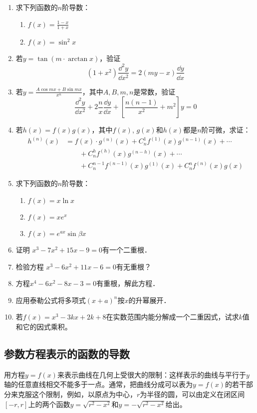 \begin{ex}
\begin{enumerate}
    \item 求下列函数的$n$阶导数：
\begin{multicols}{2}
\begin{enumerate}
    \item $f(x)=\frac{1-x}{1+x}$
    \item $f(x)=\sin^2 x$
\end{enumerate}
\end{multicols}
    \item 若$y=\tan(m\cdot \arctan x)$，验证
\[(1+x^2)\frac{\dd^2 y}{\dd x^2}=2(my-x)\frac{\dd y}{\dd x}\]
\item 若$y=\frac{A\cos mx+B\sin mx}{x^n}$，其中$A,B,m,n$是常数，验证
\[\frac{\dd^2 y}{\dd x^2}+2\frac{n}{x}\frac{\dd y}{\dd x}+\left[\frac{n(n-1)}{x^2}+m^2\right]y=0\]

\item 若$h(x)=f(x)g(x)$，其中$f(x)$, $g(x)$和$h(x)$都是$n$阶可微，求证：
\[\begin{split}
    h^{(n)}(x)&=f(x)\cdot g^{(n)}(x)+C^1_n f^{(1)}(x)g^{(n-1)}(x)+\cdots \\
    &\qquad +C^h_n f^{(h)}(x)g^{(n-h)}(x)+\cdots\\
    &\qquad  +C^{n-1}_n f^{(n-1)}(x)g^{(1)}(x)+C^n_n f^{(n)}(x)g(x)
\end{split}\]
\item 求下列函数的$n$阶导数：
\begin{multicols}{2}
\begin{enumerate}
\item $f(x)=x\ln x$
\item $f(x)=xe^x$
\item $f(x)=e^{ax}\sin\beta x$
\end{enumerate}
\end{multicols}
\item 证明 $x^3-7x^2+15x-9=0$有一个二重根．
\item 检验方程 $x^3-6x^2+11x-6=0$有无重根？
\item 方程$x^4-6x^2-8x-3=0$有重根，解此方程．
\item 应用泰勒公式将多项式$(x+a)^n$按$x$的升幂展开．
\item 若$f(x)=x^3-3kx+2k+8$在实数范围内能分解成一个二重因式，试求$k$值和它的因式乘积。
\end{enumerate}   
\end{ex}

\subsection{参数方程表示的函数的导数}
用方程$y=f(x)$来表示曲线在几何上受很大的限制：这样表示的曲线与平行于$y$轴的任意直线相交不能多于一点。通常，把曲线分成可以表为$y=f(x)$的若干部分来克服这个限制，例如，以原点为中心，$r$为半径的圆，可以由定义在闭区间$[-r,r]$上的两个函数$y=\sqrt{r^2-x^2}$和$y=-\sqrt{r^2-x^2}$给出。


